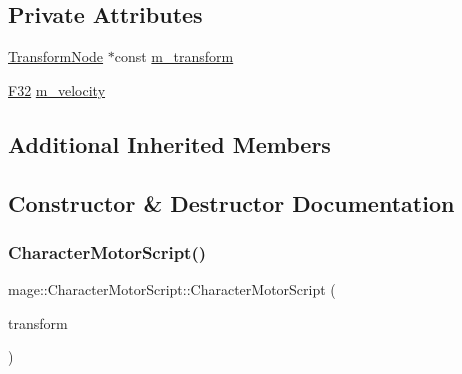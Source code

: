 \subsection*{Private Attributes}
\begin{DoxyCompactItemize}
\item 
\hyperlink{classmage_1_1_transform_node}{Transform\+Node} $\ast$const \hyperlink{classmage_1_1_character_motor_script_ab73049127363ded0e6e8fb474b51794e}{m\+\_\+transform}
\item 
\hyperlink{namespacemage_aa97e833b45f06d60a0a9c4fc22ae02c0}{F32} \hyperlink{classmage_1_1_character_motor_script_ab5a6c95ef8d0d7d914c2f7c447137f04}{m\+\_\+velocity}
\end{DoxyCompactItemize}
\subsection*{Additional Inherited Members}


\subsection{Constructor \& Destructor Documentation}
\hypertarget{classmage_1_1_character_motor_script_a3ec398d61411a1d8adaf330f00fdd7ea}{}\label{classmage_1_1_character_motor_script_a3ec398d61411a1d8adaf330f00fdd7ea} 
\subsubsection{\texorpdfstring{Character\+Motor\+Script()}{CharacterMotorScript()}\hspace{0.1cm}{\footnotesize\ttfamily [1/3]}}
{\footnotesize\ttfamily mage\+::\+Character\+Motor\+Script\+::\+Character\+Motor\+Script (\begin{DoxyParamCaption}\item[{\hyperlink{classmage_1_1_transform_node}{Transform\+Node} $\ast$}]{transform }\end{DoxyParamCaption})\hspace{0.3cm}{\ttfamily [explicit]}}

\hypertarget{classmage_1_1_character_motor_script_aa8b4b2c6eba7077677db51e24c2a9a36}{}\label{classmage_1_1_character_motor_script_aa8b4b2c6eba7077677db51e24c2a9a36} 
